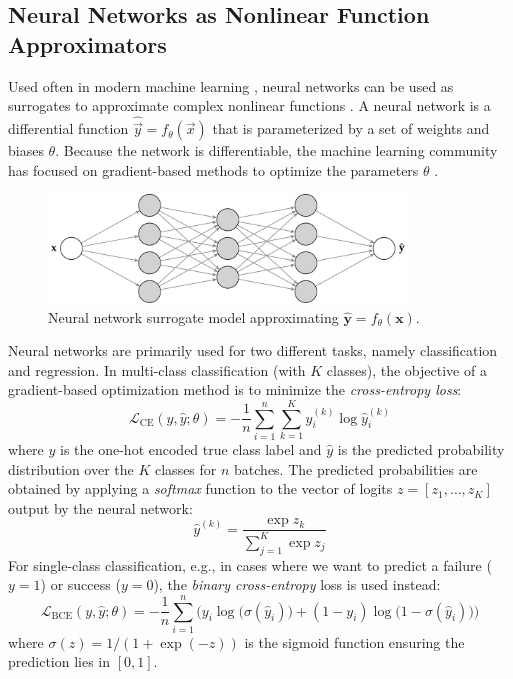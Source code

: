 \subsection{Neural Networks as Nonlinear Function Approximators}
Used often in modern machine learning \cite{goodfellow2016deep}, neural networks can be used as surrogates to approximate complex nonlinear functions \cite{dmbook}.
A neural network is a differential function $\hat{\vec{y}} = f_\theta(\vec{x})$ that is parameterized by a set of weights and biases $\theta$.
Because the network is differentiable, the machine learning community has focused on gradient-based methods to optimize the parameters $\theta$ \cite{kingma2014adam,hinton2014rmsprop,optbook}.

\begin{figure}[t!]
    \centering
    \includegraphics[width=0.85\textwidth]{diagrams/background/nn.pdf}
    \caption{Neural network surrogate model approximating $\hat{\mathbf{y}} = f_\theta(\mathbf{x})$.}
    \label{fig:ann}
\end{figure}

Neural networks are primarily used for two different tasks, namely classification and regression.
In multi-class classification (with $K$ classes), the objective of a gradient-based optimization method is to minimize the \textit{cross-entropy loss}:
\begin{equation}
    \mathcal{L}_{\text{CE}}(y, \hat{y}; \theta) = -\frac{1}{n}\sum_{i=1}^n\sum_{k=1}^K y^{(k)}_i \log \hat{y}^{(k)}_i
\end{equation}
where $y$ is the one-hot encoded true class label and $\hat{y}$ is the predicted probability distribution over the $K$ classes for $n$ batches.
The predicted probabilities are obtained by applying a \textit{softmax} function to the vector of logits $z = [z_1, \dots, z_K]$ output by the neural network:
\begin{equation}
    \hat{y}^{(k)} = \frac{\exp z_k}{\sum_{j=1}^K \exp z_j}
\end{equation}
For single-class classification, e.g., in cases where we want to predict a failure ($y = 1$) or success ($y=0$), the \textit{binary cross-entropy} loss is used instead:
\begin{equation}
    \mathcal{L}_{\text{BCE}}(y, \hat{y}; \theta) = -\frac{1}{n} \sum_{i=1}^n \Big( y_i \log \big(\sigma(\hat{y}_i)\big) + (1 - y_i) \log \big(1 - \sigma(\hat{y}_i)\big) \Big)
\end{equation}
where $\sigma(z) = 1 / (1 + \exp(-z))$ is the sigmoid function ensuring the prediction lies in $[0,1]$.

